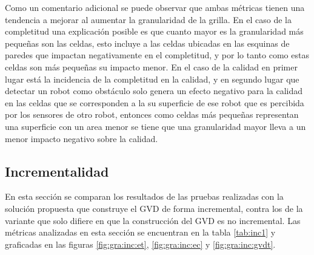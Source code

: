 Como un comentario adicional se puede observar que ambas métricas tienen una
tendencia a mejorar al aumentar la granularidad de la grilla. En el caso de la
completitud una explicación posible es que cuanto mayor es la granularidad
más pequeñas son las celdas, esto incluye a las celdas ubicadas en las esquinas de
paredes que impactan negativamente en el completitud, y por lo tanto como estas celdas son
más pequeñas su impacto menor. En el caso de la
calidad en primer lugar está la incidencia de la completitud en la calidad, y en
segundo lugar que detectar un robot como obstáculo solo genera un efecto
negativo para la calidad en las celdas que se corresponden a la su superficie
de ese robot que es percibida por los sensores de otro robot, entonces como
celdas más pequeñas representan una superficie con un area menor se tiene que una
granularidad mayor lleva a un menor impacto negativo sobre la calidad.




\subsection{Incrementalidad}\label{sec:exp:inc}
En esta sección se comparan los resultados de las pruebas realizadas con la
solución propuesta que construye el GVD de forma incremental, contra los de la 
variante que solo difiere en que la construcción del GVD es no incremental. Las
métricas analizadas en esta sección se encuentran en la tabla \ref{tab:inc1}
y graficadas en las figuras \ref{fig:gra:inc:et}, \ref{fig:gra:inc:ec} y
\ref{fig:gra:inc:gvdt}.



